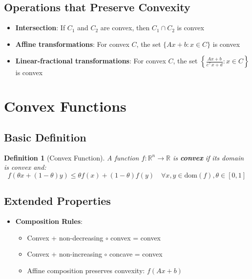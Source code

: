 \documentclass{article}
\theoremstyle{plain}
\newtheorem{theorem}{Theorem}[section]
\newtheorem{definition}[theorem]{Definition}
\begin{document}
\subsection{Operations that Preserve Convexity}
\begin{itemize}
    \item \textbf{Intersection}: If \( C_1 \) and \( C_2 \) are convex, then \( C_1 \cap C_2 \) is convex
    
    \item \textbf{Affine transformations}: For convex \( C \), the set \( \{Ax + b : x \in C\} \) is convex
    
    \item \textbf{Linear-fractional transformations}: For convex \( C \), the set \( \left\{\frac{Ax+b}{c^\top x + d} : x \in C\right\} \) is convex
\end{itemize}

\section{Convex Functions}
\subsection{Basic Definition}
\begin{definition}[Convex Function]
A function \( f : \mathbb{R}^n \to \mathbb{R} \) is \textbf{convex} if its domain is convex and:
\[
f(\theta x + (1-\theta)y) \leq \theta f(x) + (1-\theta)f(y) \quad \forall x,y \in \text{dom}(f), \theta \in [0,1]
\]
\end{definition}

\begin{center}
\end{center}

\subsection{Extended Properties} %
\begin{itemize}
    \begin{theorem}[Partial Minimization]
If \( g(x,y) \) is convex and \( C \) is convex, then \( f(x) = \min_{y \in C} g(x,y) \) is convex.
\end{theorem}
    
    \item \textbf{Composition Rules}:
    \begin{itemize}
        \item Convex + non-decreasing \(\circ\) convex = convex
        \item Convex + non-increasing \(\circ\) concave = convex
        \item Affine composition preserves convexity: \( f(Ax+b) \)
    \end{itemize}
\end{itemize}
\end{document}
